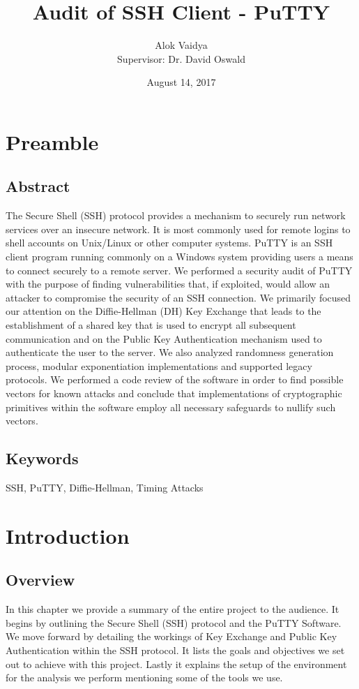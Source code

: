 \documentclass{report}
\title{Audit of SSH Client - PuTTY}
\author{Alok Vaidya\\[1cm]{\large Supervisor: Dr. David Oswald}}
\date{August 14, 2017}
\begin{document}
\maketitle
\tableofcontents
\chapter{Preamble}
\section{Abstract}
The Secure Shell (SSH) protocol provides a mechanism to securely run network services over an insecure network. It is most commonly used for remote logins to shell accounts on Unix/Linux or other computer systems. PuTTY is an SSH client program running commonly on a Windows system providing users a means to connect securely to a remote server. We performed a security audit of PuTTY with the purpose of finding vulnerabilities that, if exploited, would allow an attacker to compromise the security of an SSH connection. We primarily focused our attention on the Diffie-Hellman (DH) Key Exchange that leads to the establishment of a shared key that is used to encrypt all subsequent communication and on the Public Key Authentication mechanism used to authenticate the user to the server. We also analyzed randomness generation process, modular exponentiation implementations and supported legacy protocols. We performed a code review of the software in order to find possible vectors for known attacks and conclude that implementations of cryptographic primitives within the software employ all necessary safeguards to nullify such vectors.
\section{Keywords}
SSH, PuTTY, Diffie-Hellman, Timing Attacks
\chapter{Introduction}
\section{Overview}
In this chapter we provide a summary of the entire project to the audience. It begins by outlining the Secure Shell (SSH) protocol and the PuTTY Software. We move forward by detailing the workings of Key Exchange and Public Key Authentication within the SSH protocol. It lists the goals and objectives we set out to achieve with this project. Lastly it explains the setup of the environment for the analysis we perform mentioning some of the tools we use.
\end{document}
